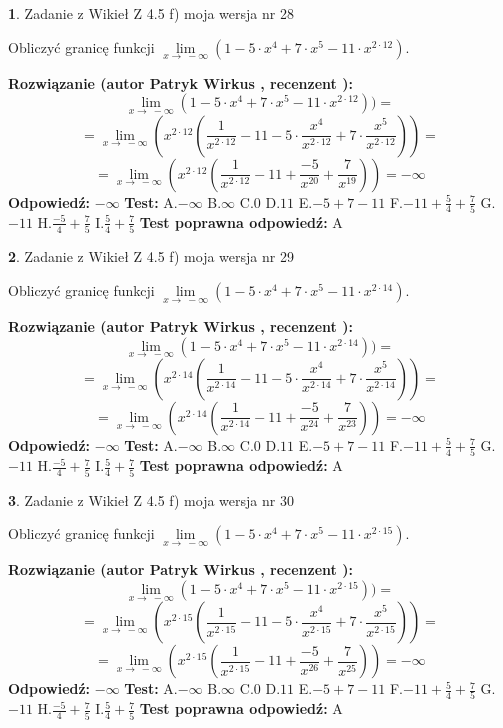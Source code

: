 \documentclass[12pt, a4paper]{article}
\theoremstyle{definition} %
\newtheorem{zad}{}
\newcommand{\zadStart}[1]{\begin{zad}#1\newline}
\newcommand{\zadStop}{\end{zad}}
\newcommand{\rozwStart}[2]{\noindent \textbf{Rozwiązanie (autor #1 , recenzent #2): }\newline}
\newcommand{\rozwStop}{\newline}
\newcommand{\odpStart}{\noindent \textbf{Odpowiedź:}\newline}
\newcommand{\odpStop}{\newline}
\newcommand{\testStart}{\noindent \textbf{Test:}\newline}
\newcommand{\testStop}{\newline}
\newcommand{\kluczStart}{\noindent \textbf{Test poprawna odpowiedź:}\newline}
\newcommand{\kluczStop}{\newline}
\begin{document}
\zadStart{Zadanie z Wikieł Z 4.5 f) moja wersja nr 28}



Obliczyć granicę funkcji  $\lim\limits_{x\to\ -\infty}(1 - 5 \cdot x^{4}+7 \cdot x^{5}- 11 \cdot x^{2\cdot12})$.
\zadStop
\rozwStart{Patryk Wirkus}{}
$$\lim\limits_{x\to\ -\infty}(1 - 5 \cdot x^{4}+7 \cdot x^{5}- 11 \cdot x^{2\cdot12}))=$$
$$=\lim\limits_{x\to\ -\infty}(x^{2\cdot12}(\frac{1}{x^{2\cdot12}}-11 -5 \cdot \frac{x^{4}}{x^{2\cdot12}}+7 \cdot \frac{x^{5}}{x^{2\cdot12}}))=$$
$$=\lim\limits_{x\to\ -\infty}(x^{2\cdot12}(\frac{1}{x^{2\cdot12}}-11 + \frac{-5}{x^{20}}+ \frac{7}{x^{19}}))=-\infty$$
\rozwStop
\odpStart
$-\infty$
\odpStop
\testStart
A.$-\infty$ B.$\infty$ C.$0$ D.$11$ E.$-5 + 7 - 11$
F.$-11+\frac{5}{4}+\frac{7}{5}$ G.$-11$
H.$\frac{-5}{4}+\frac{7}{5}$
I.$\frac{5}{4}+\frac{7}{5}$
\testStop
\kluczStart
A
\kluczStop



\zadStart{Zadanie z Wikieł Z 4.5 f) moja wersja nr 29}



Obliczyć granicę funkcji  $\lim\limits_{x\to\ -\infty}(1 - 5 \cdot x^{4}+7 \cdot x^{5}- 11 \cdot x^{2\cdot14})$.
\zadStop
\rozwStart{Patryk Wirkus}{}
$$\lim\limits_{x\to\ -\infty}(1 - 5 \cdot x^{4}+7 \cdot x^{5}- 11 \cdot x^{2\cdot14}))=$$
$$=\lim\limits_{x\to\ -\infty}(x^{2\cdot14}(\frac{1}{x^{2\cdot14}}-11 -5 \cdot \frac{x^{4}}{x^{2\cdot14}}+7 \cdot \frac{x^{5}}{x^{2\cdot14}}))=$$
$$=\lim\limits_{x\to\ -\infty}(x^{2\cdot14}(\frac{1}{x^{2\cdot14}}-11 + \frac{-5}{x^{24}}+ \frac{7}{x^{23}}))=-\infty$$
\rozwStop
\odpStart
$-\infty$
\odpStop
\testStart
A.$-\infty$ B.$\infty$ C.$0$ D.$11$ E.$-5 + 7 - 11$
F.$-11+\frac{5}{4}+\frac{7}{5}$ G.$-11$
H.$\frac{-5}{4}+\frac{7}{5}$
I.$\frac{5}{4}+\frac{7}{5}$
\testStop
\kluczStart
A
\kluczStop



\zadStart{Zadanie z Wikieł Z 4.5 f) moja wersja nr 30}



Obliczyć granicę funkcji  $\lim\limits_{x\to\ -\infty}(1 - 5 \cdot x^{4}+7 \cdot x^{5}- 11 \cdot x^{2\cdot15})$.
\zadStop
\rozwStart{Patryk Wirkus}{}
$$\lim\limits_{x\to\ -\infty}(1 - 5 \cdot x^{4}+7 \cdot x^{5}- 11 \cdot x^{2\cdot15}))=$$
$$=\lim\limits_{x\to\ -\infty}(x^{2\cdot15}(\frac{1}{x^{2\cdot15}}-11 -5 \cdot \frac{x^{4}}{x^{2\cdot15}}+7 \cdot \frac{x^{5}}{x^{2\cdot15}}))=$$
$$=\lim\limits_{x\to\ -\infty}(x^{2\cdot15}(\frac{1}{x^{2\cdot15}}-11 + \frac{-5}{x^{26}}+ \frac{7}{x^{25}}))=-\infty$$
\rozwStop
\odpStart
$-\infty$
\odpStop
\testStart
A.$-\infty$ B.$\infty$ C.$0$ D.$11$ E.$-5 + 7 - 11$
F.$-11+\frac{5}{4}+\frac{7}{5}$ G.$-11$
H.$\frac{-5}{4}+\frac{7}{5}$
I.$\frac{5}{4}+\frac{7}{5}$
\testStop
\kluczStart
A
\kluczStop
\end{document}
